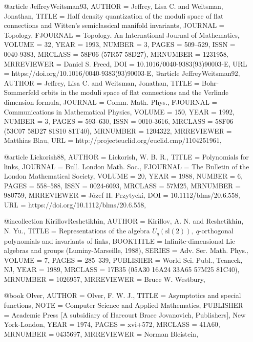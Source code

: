 @article {JeffreyWeitsman93,
    AUTHOR = {Jeffrey, Lisa C. and Weitsman, Jonathan},
     TITLE = {Half density quantization of the moduli space of flat
              connections and {W}itten's semiclassical manifold invariants},
   JOURNAL = {Topology},
  FJOURNAL = {Topology. An International Journal of Mathematics},
    VOLUME = {32},
      YEAR = {1993},
    NUMBER = {3},
     PAGES = {509--529},
      ISSN = {0040-9383},
   MRCLASS = {58F06 (57R57 58D27)},
  MRNUMBER = {1231958},
MRREVIEWER = {Daniel S. Freed},
       DOI = {10.1016/0040-9383(93)90003-E},
       URL = {https://doi.org/10.1016/0040-9383(93)90003-E},
}
@article {JeffreyWeitsman92,
    AUTHOR = {Jeffrey, Lisa C. and Weitsman, Jonathan},
     TITLE = {Bohr-{S}ommerfeld orbits in the moduli space of flat
              connections and the {V}erlinde dimension formula},
   JOURNAL = {Comm. Math. Phys.},
  FJOURNAL = {Communications in Mathematical Physics},
    VOLUME = {150},
      YEAR = {1992},
    NUMBER = {3},
     PAGES = {593--630},
      ISSN = {0010-3616},
   MRCLASS = {58F06 (53C07 58D27 81S10 81T40)},
  MRNUMBER = {1204322},
MRREVIEWER = {Matthias Blau},
       URL = {http://projecteuclid.org/euclid.cmp/1104251961},
}

@article {Lickorish88,
    AUTHOR = {Lickorish, W. B. R.},
     TITLE = {Polynomials for links},
   JOURNAL = {Bull. London Math. Soc.},
  FJOURNAL = {The Bulletin of the London Mathematical Society},
    VOLUME = {20},
      YEAR = {1988},
    NUMBER = {6},
     PAGES = {558--588},
      ISSN = {0024-6093},
   MRCLASS = {57M25},
  MRNUMBER = {980759},
MRREVIEWER = {J\'{o}zef H. Przytycki},
       DOI = {10.1112/blms/20.6.558},
       URL = {https://doi.org/10.1112/blms/20.6.558},
}

@incollection {KirillovReshetikhin,
    AUTHOR = {Kirillov, A. N. and Reshetikhin, N. Yu.},
     TITLE = {Representations of the algebra {${U}_q(\text{
              sl}(2)),\;q$}-orthogonal polynomials and invariants of links},
 BOOKTITLE = {Infinite-dimensional {L}ie algebras and groups
              ({L}uminy-{M}arseille, 1988)},
    SERIES = {Adv. Ser. Math. Phys.},
    VOLUME = {7},
     PAGES = {285--339},
 PUBLISHER = {World Sci. Publ., Teaneck, NJ},
      YEAR = {1989},
   MRCLASS = {17B35 (05A30 16A24 33A65 57M25 81C40)},
  MRNUMBER = {1026957},
MRREVIEWER = {Bruce W. Westbury},
}

@book {Olver,
    AUTHOR = {Olver, F. W. J.},
     TITLE = {Asymptotics and special functions},
      NOTE = {Computer Science and Applied Mathematics},
 PUBLISHER = {Academic Press [A subsidiary of Harcourt Brace Jovanovich,
              Publishers], New York-London},
      YEAR = {1974},
     PAGES = {xvi+572},
   MRCLASS = {41A60},
  MRNUMBER = {0435697},
MRREVIEWER = {Norman Bleistein},
}

